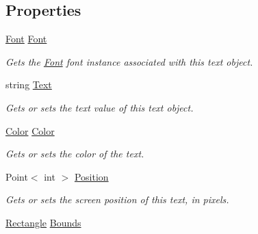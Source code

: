 \subsection*{Properties}
\begin{DoxyCompactItemize}
\item 
\hyperlink{class_tri_devs_1_1_tri_engine2_d_1_1_text_1_1_font}{Font} \hyperlink{interface_tri_devs_1_1_tri_engine2_d_1_1_text_1_1_i_text_object_a7db20df8d43bd52860b6340f3195e2fe}{Font}
\begin{DoxyCompactList}\small\item\em Gets the \hyperlink{class_tri_devs_1_1_tri_engine2_d_1_1_text_1_1_font}{Font} font instance associated with this text object. \end{DoxyCompactList}\item 
string \hyperlink{interface_tri_devs_1_1_tri_engine2_d_1_1_text_1_1_i_text_object_ad2e24adb672d6b09a330b7741469ee62}{Text}
\begin{DoxyCompactList}\small\item\em Gets or sets the text value of this text object. \end{DoxyCompactList}\item 
\hyperlink{struct_tri_devs_1_1_tri_engine2_d_1_1_color}{Color} \hyperlink{interface_tri_devs_1_1_tri_engine2_d_1_1_text_1_1_i_text_object_a1e04ee3e0df6720547f68615dacd79d6}{Color}
\begin{DoxyCompactList}\small\item\em Gets or sets the color of the text. \end{DoxyCompactList}\item 
Point$<$ int $>$ \hyperlink{interface_tri_devs_1_1_tri_engine2_d_1_1_text_1_1_i_text_object_afd9df06adbc3cfa43350d39af44bc8e7}{Position}
\begin{DoxyCompactList}\small\item\em Gets or sets the screen position of this text, in pixels. \end{DoxyCompactList}\item 
\hyperlink{struct_tri_devs_1_1_tri_engine2_d_1_1_rectangle}{Rectangle} \hyperlink{interface_tri_devs_1_1_tri_engine2_d_1_1_text_1_1_i_text_object_a57f3d3a04b695cad0a260ca13cee4062}{Bounds}

\end{DoxyCompactItemize}
